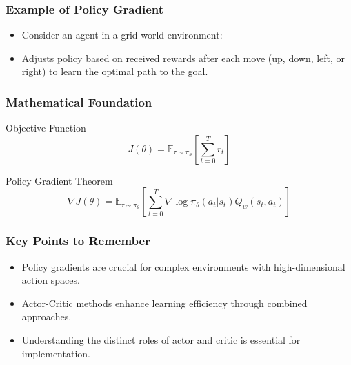 \documentclass[aspectratio=169]{beamer}
\begin{document}
\begin{frame}[fragile]
    \frametitle{Example of Policy Gradient}
    \begin{itemize}
        \item Consider an agent in a grid-world environment:
        \item Adjusts policy based on received rewards after each move (up, down, left, or right) to learn the optimal path to the goal.
    \end{itemize}
\end{frame}

\begin{frame}[fragile]
    \frametitle{Mathematical Foundation}
    \begin{block}{Objective Function}
        \begin{equation}
            J(\theta) = \mathbb{E}_{\tau \sim \pi_\theta} \left[ \sum_{t=0}^{T} r_t \right]
        \end{equation}
    \end{block}
    
    \begin{block}{Policy Gradient Theorem}
        \begin{equation}
            \nabla J(\theta) = \mathbb{E}_{\tau \sim \pi_\theta} \left[ \sum_{t=0}^{T} \nabla \log \pi_\theta(a_t|s_t) Q_w(s_t, a_t) \right]
        \end{equation}
    \end{block}
\end{frame}

\begin{frame}[fragile]
    \frametitle{Key Points to Remember}
    \begin{itemize}
        \item Policy gradients are crucial for complex environments with high-dimensional action spaces.
        \item Actor-Critic methods enhance learning efficiency through combined approaches.
        \item Understanding the distinct roles of actor and critic is essential for implementation.
    \end{itemize}
\end{frame}
\end{document}
